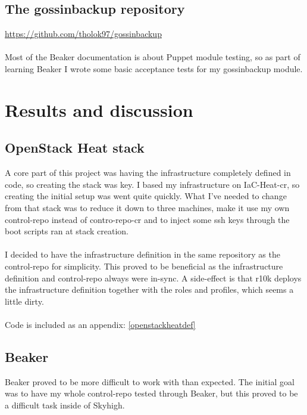 \subsection{The gossinbackup repository}

\url{https://github.com/tholok97/gossinbackup}
\\
\\
Most of the Beaker documentation is about Puppet module testing, so as part of learning Beaker I wrote some basic acceptance tests for my gossinbackup module.


\section{Results and discussion}

\subsection{OpenStack Heat stack}

A core part of this project was having the infrastructure completely defined in code, so creating the stack was key. I based my infrastructure on IaC-Heat-cr\cite{iacheatcrgithub}, so creating the initial setup was went quite quickly. What I've needed to change from that stack was to reduce it down to three machines, make it use my own control-repo instead of contro-repo-cr\cite{controlrepocrgithub} and to inject some ssh keys through the boot scripts ran at stack creation.
\\
\\
I decided to have the infrastructure definition in the same repository as the control-repo for simplicity. This proved to be beneficial as the infrastructure definition and control-repo always were in-sync. A side-effect is that r10k deploys the infrastructure definition together with the roles and profiles, which seems a little dirty. 
\\
\\
Code is included as an appendix: \ref{openstackheatdef}

\subsection{Beaker}

Beaker proved to be more difficult to work with than expected. The initial goal was to have my whole control-repo tested through Beaker, but this proved to be a difficult task inside of Skyhigh. 


